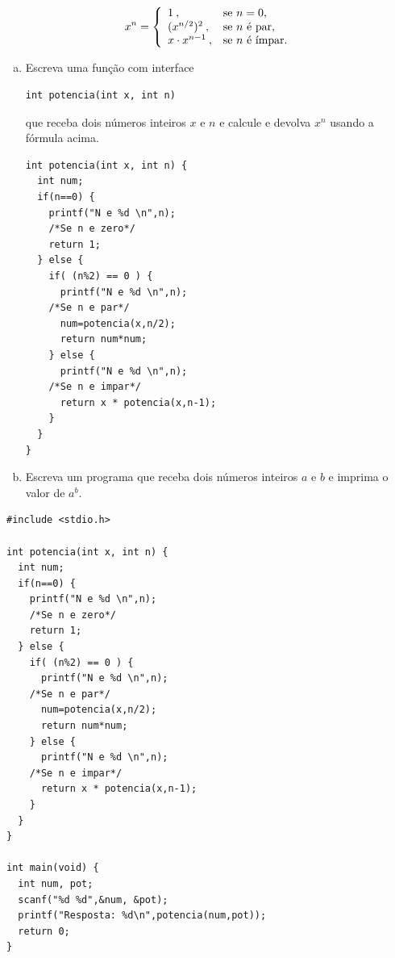 \documentclass[a4paper,10pt]{article}
\begin{document}
\begin{enumerate}
\[    x^n = \left \{ \begin{array}{ll}
        1\:, & \textnormal{se $n = 0$,} \\
        (x^{n/2})^2\:, & \textnormal{se $n$ é par,} \\
        x \cdot x^{n-1}\:, & \textnormal{se $n$ é ímpar.}
      \end{array} \right. \]

  
  
  
  
  \begin{enumerate}[(a)]
  \item Escreva uma função com interface

\begin{lstlisting}
int potencia(int x, int n)
\end{lstlisting}

que receba dois números inteiros $x$ e $n$ e calcule e devolva $x^n$ usando a fórmula acima.

\begin{lstlisting}
int potencia(int x, int n) {
  int num;
  if(n==0) {
    printf("N e %d \n",n);
    /*Se n e zero*/
    return 1;
  } else {
    if( (n%2) == 0 ) {
      printf("N e %d \n",n);
    /*Se n e par*/
      num=potencia(x,n/2);
      return num*num;
    } else {
      printf("N e %d \n",n);
    /*Se n e impar*/
      return x * potencia(x,n-1);
    }
  }
}
\end{lstlisting}

\pagebreak

\item Escreva um programa que receba dois números inteiros $a$ e $b$ e imprima o valor de $a^b$.
  \end{enumerate}
  
\begin{lstlisting}
#include <stdio.h>

int potencia(int x, int n) {
  int num;
  if(n==0) {
    printf("N e %d \n",n);
    /*Se n e zero*/
    return 1;
  } else {
    if( (n%2) == 0 ) {
      printf("N e %d \n",n);
    /*Se n e par*/
      num=potencia(x,n/2);
      return num*num;
    } else {
      printf("N e %d \n",n);
    /*Se n e impar*/
      return x * potencia(x,n-1);
    }
  }
}

int main(void) {
  int num, pot;
  scanf("%d %d",&num, &pot);
  printf("Resposta: %d\n",potencia(num,pot));
  return 0;
}
\end{lstlisting}

\end{enumerate} %
\pagebreak
\end{document}
